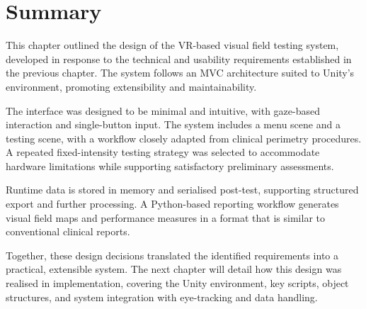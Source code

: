 \documentclass{l4proj}
\begin{document}
\section{Summary}

This chapter outlined the design of the VR-based visual field testing system, developed in response to the technical and usability requirements established in the previous chapter. The system follows an MVC architecture suited to Unity’s environment, promoting extensibility and maintainability.

The interface was designed to be minimal and intuitive, with gaze-based interaction and single-button input. The system includes a menu scene and a testing scene, with a workflow closely adapted from clinical perimetry procedures. A repeated fixed-intensity testing strategy was selected to accommodate hardware limitations while supporting satisfactory preliminary assessments.

Runtime data is stored in memory and serialised post-test, supporting structured export and further processing. A Python-based reporting workflow generates visual field maps and performance measures in a format that is similar to conventional clinical reports.

Together, these design decisions translated the identified requirements into a practical, extensible system. The next chapter will detail how this design was realised in implementation, covering the Unity environment, key scripts, object structures, and system integration with eye-tracking and data handling.
\end{document}
